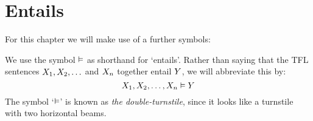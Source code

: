 \section{Entails}
For this chapter we will make use of a further symbols:
%

\label{doubleTurnstile}
We use the symbol $\vDash$ as shorthand for `entails'.
Rather than saying that the TFL sentences $X_1, X_2, \ldots$ and $X_n$ together entail $Y$, we will abbreviate this by:
$$X_1, X_2, \ldots, X_n \vDash Y$$
The symbol `$\vDash$' is known as \emph{the double-turnstile}, since it looks like a turnstile with two horizontal beams.

